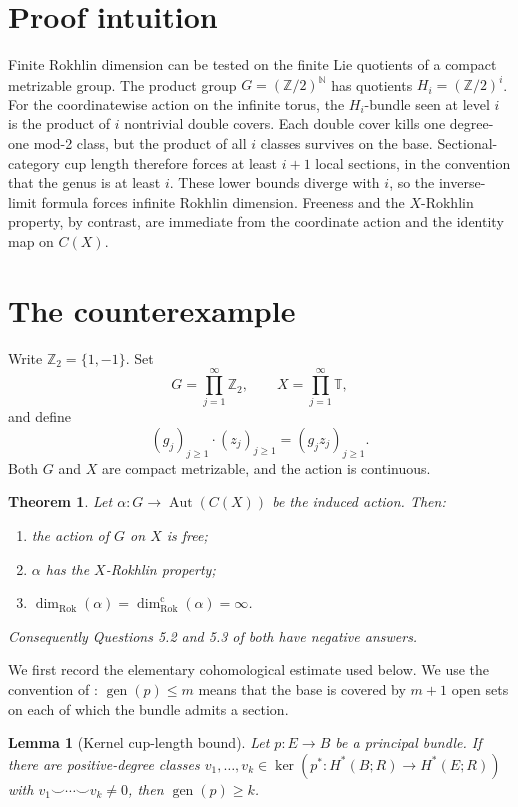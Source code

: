 \documentclass[11pt]{article}
\newtheorem{theorem}{Theorem}
\newtheorem{lemma}{Lemma}
\newcommand{\T}{\mathbb T}
\newcommand{\Rok}{\operatorname{dim}_{\mathrm{Rok}}}
\newcommand{\genus}{\operatorname{gen}}
\begin{document}
\section{Proof intuition}

Finite Rokhlin dimension can be tested on the finite Lie quotients of a compact metrizable group. The product group \(G=(\mathbb Z/2)^{\mathbb N}\) has quotients \(H_i=(\mathbb Z/2)^i\). For the coordinatewise action on the infinite torus, the \(H_i\)-bundle seen at level \(i\) is the product of \(i\) nontrivial double covers. Each double cover kills one degree-one mod-2 class, but the product of all \(i\) classes survives on the base. Sectional-category cup length therefore forces at least \(i+1\) local sections, in the convention that the genus is at least \(i\). These lower bounds diverge with \(i\), so the inverse-limit formula forces infinite Rokhlin dimension. Freeness and the \(X\)-Rokhlin property, by contrast, are immediate from the coordinate action and the identity map on \(C(X)\).

\section{The counterexample}

Write \(\mathbb Z_2=\{1,-1\}\). Set
\[
G=\prod_{j=1}^{\infty}\mathbb Z_2,
\qquad
X=\prod_{j=1}^{\infty}\T,
\]
and define
\[
(g_j)_{j\geq1}\cdot(z_j)_{j\geq1}=(g_jz_j)_{j\geq1}.
\]
Both \(G\) and \(X\) are compact metrizable, and the action is continuous.

\begin{theorem}\label{thm:main}
Let \(\alpha:G\to\operatorname{Aut}(C(X))\) be the induced action. Then:
\begin{enumerate}[label=\textup{(\roman*)}]
\item the action of \(G\) on \(X\) is free;
\item \(\alpha\) has the \(X\)-Rokhlin property;
\item \(\Rok(\alpha)=\Rok^{\mathrm c}(\alpha)=\infty\).
\end{enumerate}
Consequently Questions 5.2 and 5.3 of \cite{Gardella} both have negative answers.
\end{theorem}

We first record the elementary cohomological estimate used below. We use the convention of \cite{GHTW}: \(\genus(p)\leq m\) means that the base is covered by \(m+1\) open sets on each of which the bundle admits a section.

\begin{lemma}[Kernel cup-length bound]\label{lem:cup}
Let \(p:E\to B\) be a principal bundle. If there are positive-degree classes
\(v_1,\ldots,v_k\in\ker(p^*:H^*(B;R)\to H^*(E;R))\) with
\(v_1\smile\cdots\smile v_k\neq0\), then \(\genus(p)\geq k\).
\end{lemma}
\end{document}
